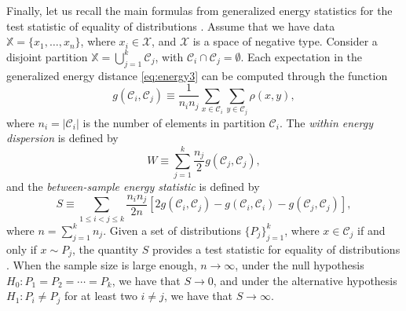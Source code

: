 \documentclass[10pt,journal,compsoc]{IEEEtran}
\newcommand\C{{\mathcal{C}}}
\begin{document}
Finally, let us recall the main formulas from generalized energy statistics
for the test statistic of equality of distributions \cite{Szkely2013}. 
Assume that we have data $\mathbb{X} = \{ x_1,\dotsc, x_n \}$, where
$x_i \in \mathcal{X}$, and $\mathcal{X}$ is a space of negative type.
Consider a disjoint partition $\mathbb{X} = \bigcup_{j=1}^k \C_j$, with
$\C_i \cap \C_j = \emptyset$.
Each expectation in the generalized energy distance
\eqref{eq:energy3}
can be computed 
through the function
\begin{equation}
\label{eq:g_def}
g (\C_i, \C_j) \equiv 
\dfrac{1}{n_i n_j}
\sum_{x \in \C_i} 
\sum_{y \in \C_j} \rho(x, y) ,
\end{equation}
where $n_i = |\C_i|$ is the number of elements in partition
$\C_i$. 
The \emph{within energy dispersion} is defined by
\begin{equation}
\label{eq:within}
W \equiv
\sum_{j=1}^{k} \dfrac{n_j}{2} g(\C_j, \C_j),
\end{equation}
and the \emph{between-sample energy statistic} is defined by
\begin{equation}
\label{eq:between}
S \equiv \!\!\!\!
\sum_{1 \le  i < j \le k } \dfrac{n_i n_{j}}{2 n} \left[
2 g(\C_i, \C_j) - 
g(\C_i, \C_i) - 
g(\C_j, \C_j)
\right],
\end{equation}
where $n = \sum_{j=1}^k n_j$.
Given a set of distributions
$\{ P_j\}_{j=1}^k$, where $x \in \C_j$ if and only if $x \sim P_j$, 
the quantity $S$ provides
a test statistic for equality of distributions
\cite{Szkely2013}.
When the sample size is large enough, $n\to \infty$,
under the null hypothesis $H_0: P_1=P_2=\dotsm=P_k$, we have that
$S\to 0$, 
and under
the alternative hypothesis $H_1: P_i \ne P_j$ for at least two $i\ne j$, 
we have that $S \to \infty$.



\end{document}
